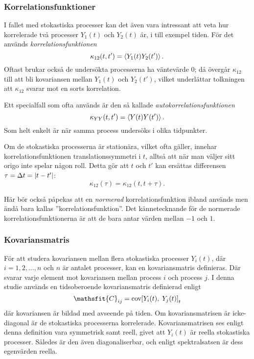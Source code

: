 \subsubsection{Korrelationsfunktioner}
I fallet med stokastiska processer kan det även vara intressant att veta hur korrelerade två processer $Y_1(t)$ och $Y_2(t)$ är, i till exempel tiden. För det används \emph{korrelationsfunktionen}
\begin{equation}\label{eq:corr}
\kappa_{12}(t, t') = \ev{Y_1(t)Y_2(t')}.
\end{equation}
Oftast brukar också de undersökta processerna ha väntevärde $0$; då övergår $\kappa_{12}$ till att bli kovariansen mellan $Y_1(t)$ och $Y_2(t')$, vilket underlättar tolkningen att $\kappa_{12}$ svarar mot en sorts korrelation. 

Ett specialfall som ofta används är den så kallade \emph{autokorrelationsfunktionen} 
\begin{equation}\label{eq:autocorr}
\kappa_{YY}(t, t') = \ev{Y(t)Y(t')}.
\end{equation}
Som helt enkelt är när samma process undersöks i olika tidpunkter. 

Om de stokastiska processerna är stationära, vilket ofta gäller, innehar korrelationsfunktionen translationssymmetri i $t$, alltså att när man väljer sitt origo inte spelar någon roll. Detta gör att $t$ och $t'$ kan ersättas differensen~$\tau=\Delta t= \abs{t-t'}$:
\begin{equation}
\kappa_{12}(\tau) = \kappa_{12}(t, t+\tau).
\end{equation}

Här bör också påpekas att en \emph{normerad} korrelationsfunktion ibland används men ändå bara kallas ''korrelationsfunktion''. Det kännetecknande för de normerade korrelationsfunktionerna är att de bara antar värden mellan $-1$ och $1$.


\subsubsection{Kovariansmatris}\label{sec:kovmatris}
För att studera kovariansen mellan flera stokastiska processer $Y_i(t)$, där $i=1,2,\ldots,n$ och $n$ är antalet processer, kan en kovariansmatris definieras. Där svarar varje element mot kovariansen mellan process $i$ och process $j$. I denna studie används en tidsoberoende kovariansmatris definierad enligt 
\begin{equation}
\label{eq:kovmatris}
    \mathsfit{C}_{ij} = \COV{Y_i(t)}{Y_j(t)}_t
\end{equation}
där kovariansen är bildad med avseende på tiden. Om kovariansmatrisen är icke-diagonal är de stokastiska processerna korrelerade. Kovariansmatrisen ses enligt denna definition vara symmetrisk samt reell, givet att $Y_i(t)$ är reella stokastiska processer. Således är den även diagonaliserbar, och enligt spektralsatsen är dess egenvärden reella. 

